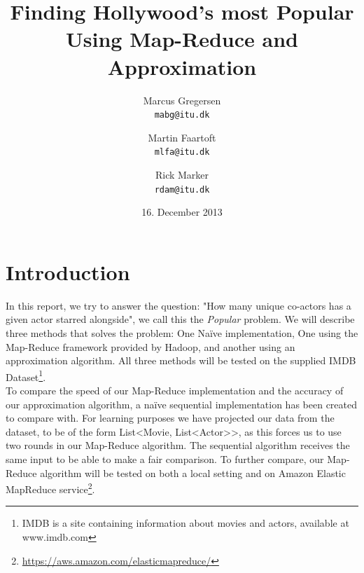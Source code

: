 \documentclass[a4paper,11pt]{article}
\begin{document}
\date{16. December 2013}
\title{Finding Hollywood's most Popular\\Using Map-Reduce and Approximation}

\author{Marcus Gregersen\\
\texttt{mabg@itu.dk} 
\and Martin Faartoft\\
\texttt{mlfa@itu.dk}
\and Rick Marker\\
\texttt{rdam@itu.dk}}
\clearpage\maketitle
\thispagestyle{empty}
\newpage
\setcounter{page}{1}
\section{Introduction}

In this report, we try to answer the question: "How many unique co-actors has a given actor starred alongside", we call this the \emph{Popular} problem. We will describe three methods that solves the problem: One Naïve implementation, One using the Map-Reduce framework provided by Hadoop, and another using an approximation algorithm. All three methods will be tested on the supplied IMDB Dataset\footnote{IMDB is a site containing information about movies and actors, available at www.imdb.com}.\\

To compare the speed of our Map-Reduce implementation and the accuracy of our approximation algorithm, a naïve sequential implementation has been created to compare with. For learning purposes we have projected our data from the dataset, to be of the form List<Movie, List<Actor>>, as this forces us to use two rounds in our Map-Reduce algorithm. The sequential algorithm receives the same input to be able to make a fair comparison. To further compare, our Map-Reduce algorithm will be tested on both a local setting and on Amazon Elastic MapReduce service\footnote{\url{https://aws.amazon.com/elasticmapreduce/}}.
\end{document}
